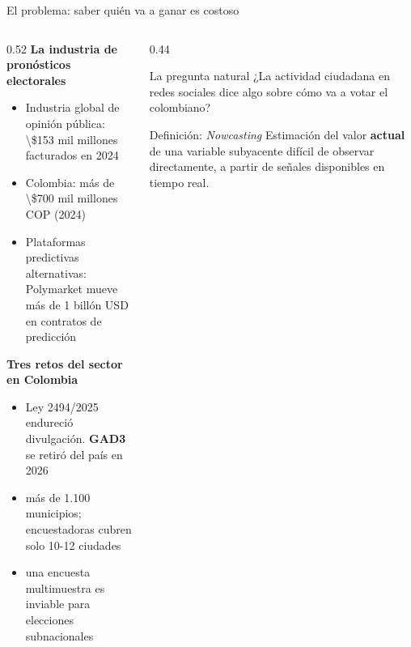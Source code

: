 \begin{frame}{El problema: saber quién va a ganar es costoso}
  \begin{columns}[T]
    \begin{column}{0.52\textwidth}
      \textbf{La industria de pronósticos electorales}
      \begin{itemize}
        \item Industria global de opinión pública:\\
              \num{\$153 mil millones} facturados en 2024
        \item Colombia: más de \num{\$700 mil millones COP} (2024)
        \item Plataformas predictivas alternativas:\\
              Polymarket mueve más de \num{1 billón USD} en contratos de predicción
      \end{itemize}
      \vspace{0.5em}
      \textbf{Tres retos del sector en Colombia}
      \begin{itemize}
        \item {} Ley 2494/2025 endureció divulgación.
              \textbf{GAD3} se retiró del país en 2026
        \item {} más de \num{1.100 municipios}; encuestadoras
              cubren solo 10-12 ciudades
        \item {} una encuesta multimuestra es inviable
              para elecciones subnacionales
      \end{itemize}
    \end{column}
    \begin{column}{0.44\textwidth}
      \vspace{0.3em}
      \begin{block}{La pregunta natural}
        ¿La actividad ciudadana en redes sociales dice algo sobre cómo va a votar el colombiano?
      \end{block}
      \vspace{0.5em}
      \begin{block}{Definición: \textit{Nowcasting}}
        Estimación del valor \textbf{actual} de una variable subyacente difícil de observar directamente, a partir de señales disponibles en tiempo real.
      \end{block}
    \end{column}
  \end{columns}
\end{frame}

